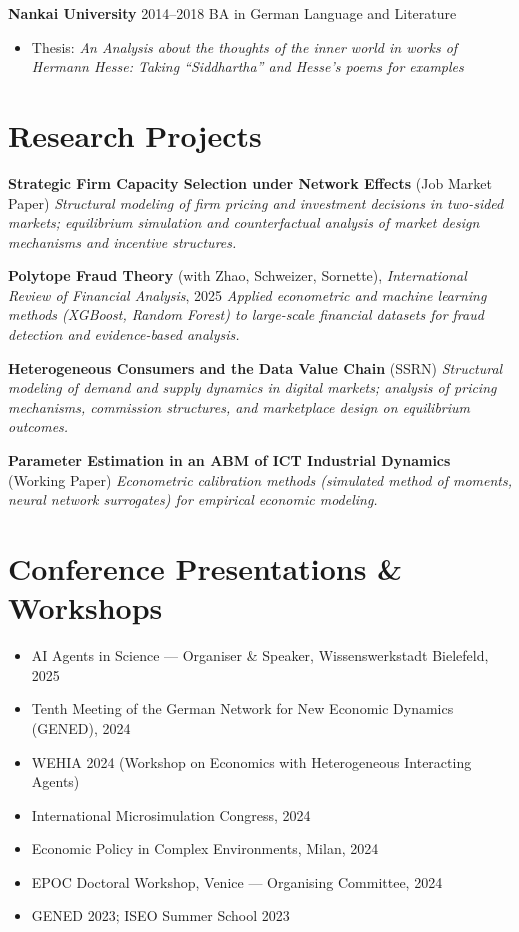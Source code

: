 \documentclass[a4paper,11pt]{article}
\begin{document}
\textbf{Nankai University} \hfill 2014–2018  
\newline BA in German Language and Literature
\begin{itemize}
    \item Thesis: \textit{An Analysis about the thoughts of the inner world in works of Hermann Hesse: Taking “Siddhartha” and Hesse’s poems for examples}
\end{itemize}


\section{Research Projects}

\textbf{Strategic Firm Capacity Selection under Network Effects} (Job Market Paper)  
\emph{Structural modeling of firm pricing and investment decisions in two-sided markets; equilibrium simulation and counterfactual analysis of market design mechanisms and incentive structures.}

\textbf{Polytope Fraud Theory} (with Zhao, Schweizer, Sornette), \emph{International Review of Financial Analysis}, 2025  
\emph{Applied econometric and machine learning methods (XGBoost, Random Forest) to large-scale financial datasets for fraud detection and evidence-based analysis.}

\textbf{Heterogeneous Consumers and the Data Value Chain} (SSRN)  
\emph{Structural modeling of demand and supply dynamics in digital markets; analysis of pricing mechanisms, commission structures, and marketplace design on equilibrium outcomes.}

\textbf{Parameter Estimation in an ABM of ICT Industrial Dynamics} (Working Paper)  
\emph{Econometric calibration methods (simulated method of moments, neural network surrogates) for empirical economic modeling.}

\section{Conference Presentations \& Workshops}

\begin{itemize}
\item AI Agents in Science — Organiser \& Speaker, Wissenswerkstadt Bielefeld, 2025  
\item Tenth Meeting of the German Network for New Economic Dynamics (GENED), 2024  
\item WEHIA 2024 (Workshop on Economics with Heterogeneous Interacting Agents)  
\item International Microsimulation Congress, 2024  
\item Economic Policy in Complex Environments, Milan, 2024  
\item EPOC Doctoral Workshop, Venice — Organising Committee, 2024  
\item GENED 2023; ISEO Summer School 2023  
\end{itemize}
\end{document}

